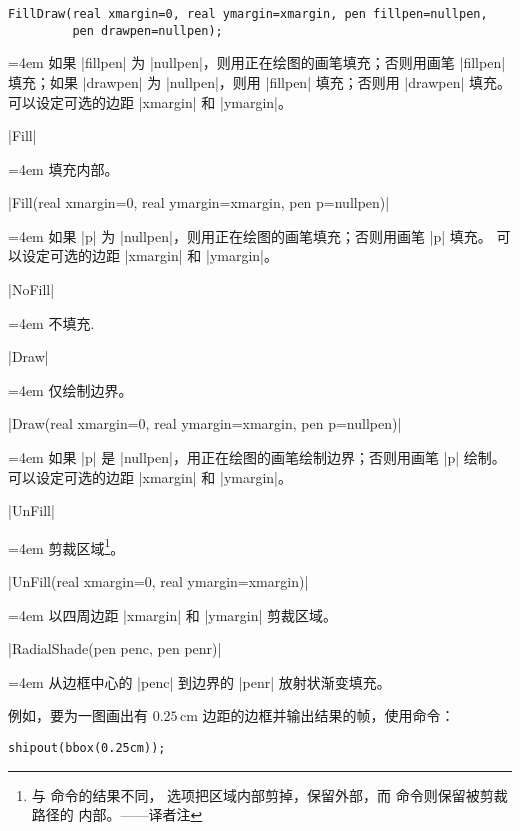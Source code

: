 \documentclass{ctexbook}
\makeatletter
\newenvironment{funclist}{\trivlist
  \parindent=0pt
\item[]
  \def\item{\medskip\par\leftskip=0pt}
  \def\go{\par\leftskip=4em}}
{\endtrivlist}
\newenvironment{typelist}{\itemize
  \let\old@item\@item
  \def\@item[##1]{\expandafter\old@item[\ttfamily\color{type!50!black}##1]}}
{\enditemize}
\newcommand\transnote[1]{\footnote{#1——译者注}}
\makeatother
\begin{document}
\begin{typelist}
\begin{funclist}
\item 
\begin{lstlisting}[style=funclist]
FillDraw(real xmargin=0, real ymargin=xmargin, pen fillpen=nullpen,
         pen drawpen=nullpen);
\end{lstlisting} \go
  如果 |fillpen| 为 |nullpen|，则用正在绘图的画笔填充；否则用画笔 |fillpen|
  填充；如果 |drawpen| 为 |nullpen|，则用 |fillpen| 填充；否则用 |drawpen|
  填充。可以设定可选的边距 |xmargin| 和 |ymargin|。

\item |Fill| \go
  填充内部。

\item |Fill(real xmargin=0, real ymargin=xmargin, pen p=nullpen)| \go
  如果 |p| 为 |nullpen|，则用正在绘图的画笔填充；否则用画笔 |p| 填充。
  可以设定可选的边距 |xmargin| 和 |ymargin|。

\item |NoFill| \go
  不填充.

\item |Draw| \go
  仅绘制边界。

\item |Draw(real xmargin=0, real ymargin=xmargin, pen p=nullpen)| \go
  如果 |p| 是 |nullpen|，用正在绘图的画笔绘制边界；否则用画笔 |p| 绘制。
  可以设定可选的边距 |xmargin| 和 |ymargin|。

\item |UnFill| \go
  剪裁区域\transnote{与  命令的结果不同，
  选项把区域内部剪掉，保留外部，而 \inlinecode{clip} 命令则保留被剪裁路径的
  内部。}。

\item |UnFill(real xmargin=0, real ymargin=xmargin)| \go
  以四周边距 |xmargin| 和 |ymargin| 剪裁区域。

\item |RadialShade(pen penc, pen penr)| \go
  从边框中心的 |penc| 到边界的 |penr| 放射状渐变填充。
\end{funclist}

例如，要为一图画出有 $0.25$\,cm 边距的边框并输出结果的帧，使用命令：
\begin{lstlisting}
shipout(bbox(0.25cm));
\end{lstlisting}


\end{typelist}
\end{document}
